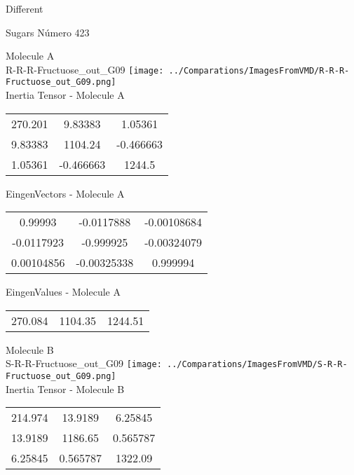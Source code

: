 \begin{center}
\vtab
\vtab
\textcolor{NavyBlue}{\Large Different}
\end{center}

 \newpage

\vtab[-2cm]
\begin{center}
{\large Sugars \tab Número 423}
\end{center}
\begin{multicols}{2}
\begin{center}

Molecule A \\ 
R-R-R-Fructuose\_out\_G09
\texttt{[image: ../Comparations/ImagesFromVMD/R-R-R-Fructuose\_out\_G09.png]}
\\
Inertia Tensor - Molecule A \\
\vtab

\begin{tabular}{|c c c|}
270.201	 & 	9.83383	 & 	1.05361	 \\
9.83383	 & 	1104.24	 & 	-0.466663	 \\
1.05361	 & 	-0.466663	 & 	1244.5
\end{tabular}

\vtab
 EingenVectors - Molecule A     \\
\vtab
\begin{tabular}{|c c c|}
0.99993	 & 	-0.0117888	 & 	-0.00108684	 \\
-0.0117923	 & 	-0.999925	 & 	-0.00324079	 \\
0.00104856	 & 	-0.00325338	 & 	0.999994
\end{tabular}

\vtab
 EingenValues - Molecule A     \\
\vtab
\begin{tabular}{|c c c|}
270.084	 & 	1104.35	 & 	1244.51	 \\
\end{tabular}
\columnbreak

Molecule B \\ 
S-R-R-Fructuose\_out\_G09
\texttt{[image: ../Comparations/ImagesFromVMD/S-R-R-Fructuose\_out\_G09.png]}
\\
Inertia Tensor - Molecule B \\
\vtab

\begin{tabular}{|c c c|}
214.974	 & 	13.9189	 & 	6.25845	 \\
13.9189	 & 	1186.65	 & 	0.565787	 \\
6.25845	 & 	0.565787	 & 	1322.09
\end{tabular}


\end{center}
\end{multicols}
